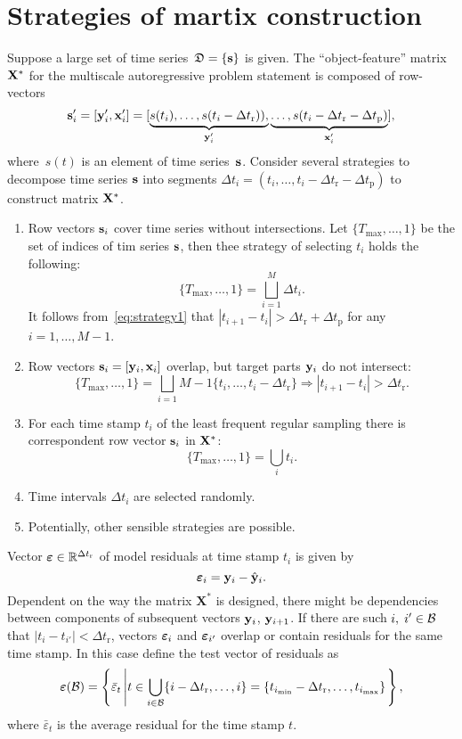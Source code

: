 \documentclass[12pt]{article}
\newcommand{\dtr}{\Delta t_\text{r}}
\newcommand{\dtp}{\Delta t_\text{p}}
\begin{document}
\section{Strategies of martix construction}
Suppose a large set of time series~${\mathfrak{D}}=\{{\mathbf{s}}\}$ is given. The ``object-feature'' matrix~${\mathbf{X}}^*$ for the multiscale autoregressive problem statement is composed of row-vectors
\[
{\mathbf{s}}_i^\prime = [{\mathbf{y}}_i^\prime, {\mathbf{x}}_i^\prime] = [\underbrace{s(t_i),\dots,s(t_i-\Delta t_\text{r})),}_{{\mathbf{y}}_i^\prime}
\underbrace{\dots,s(t_i-\Delta t_\text{r}-\Delta t_\text{p})}_{{\mathbf{x}}_i^\prime}],
\]
where~$s(t)$ is an element of time series~${\mathbf{s}}$. Consider several strategies to decompose time series ${\mathbf{s}}$ into segments $\Delta t_i = (t_i,\dots,t_i-\Delta t_\text{r}-\Delta t_\text{p})$ to construct  matrix ${\mathbf{X}}^{*}$.
\begin{enumerate}
\item Row vectors ${\mathbf{s}}_i$ cover time series without intersections. Let $\{T_{\max}, \dots, 1\}$ be the set of indices of tim series ${\mathbf{s}}$, then thee strategy of selecting $t_i$ holds the following:
\begin{equation}\label{eq:strategy1}\{T_{\max}, \dots, 1\} = \bigsqcup_{i=1}^{M} \Delta t_i.\end{equation}
It follows from~\eqref{eq:strategy1} that $|t_{i+1} - t_i| > \dtr + \dtp$ for any $i = 1, \dots, M-1$.
\item Row vectors ${\mathbf{s}}_i = [{\mathbf{y}}_i, {\mathbf{x}}_i]$ overlap, but target parts  ${\mathbf{y}}_i$ do not intersect:
    \begin{equation}\label{eq:strategy2}\{T_{\max}, \dots, 1\} = \bigsqcup_{i=1}{M-1} \{t_i,\dots,t_i-\Delta t_\text{r}\} \Rightarrow |t_{i+1} - t_i| > \dtr. \end{equation}
\item For each time stamp $t_i$ of the least frequent regular sampling there is correspondent row vector ${\mathbf{s}}_i$ in ${\mathbf{X}}^{*}$:
    \[\{T_{\max}, \dots, 1\} = \bigcup_i t_i. \]
\item Time intervals $\Delta t_i$ are selected randomly.
\item Potentially, other sensible strategies are possible.    
\end{enumerate}
 Vector $\veps \in \mathbb{R}^{\dtr}$ of model residuals at time stamp $t_i$ is given by
\[{\boldsymbol{\varepsilon}}_i = {{\mathbf{y}}}_i - \hat{{\mathbf{y}}}_i.\]
Dependent on the way the matrix $\mathbf{X}^{*}$ is designed, there might be dependencies between components of subsequent vectors ${\mathbf{y}}_{i}$, ${\mathbf{y}}_{i+1}$.
If there are such $i, \; i' \in {\mathcal{B}}$ that $|t_i - t_{i'}| < \dtr$, vectors ${\boldsymbol{\varepsilon}}_i$ and ${\boldsymbol{\varepsilon}}_{i'}$ overlap or contain residuals for the same time stamp. In this case define the test vector of residuals as
\[\veps(\cB) = \left\{\bar{\varepsilon}_t \left| t \in \bigcup_{i \in \cB} \{i-\dtr, \dots, i\} = \{t_{i_{\min}} - \dtr, \dots, t_{i_{\max}}\}\right.\right\}, \]
where $\bar{\varepsilon}_t$ is the average residual for the time stamp $t$.
\end{document}
